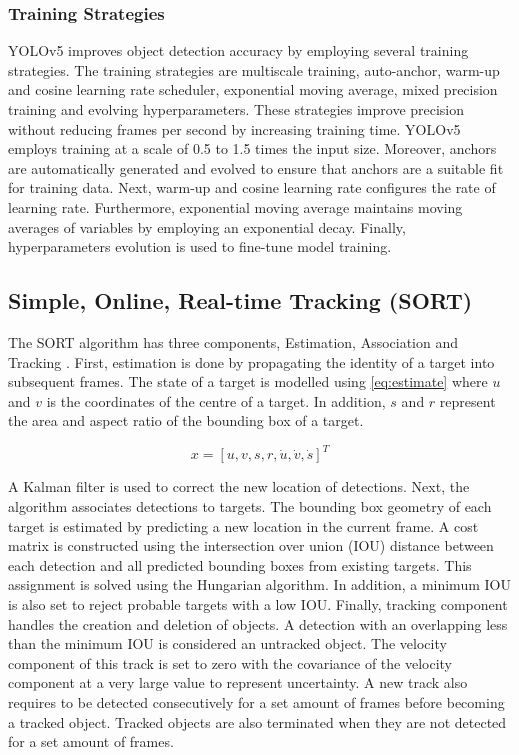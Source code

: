 \documentclass[12pt,a4paper,fleqn]{report}
\begin{document}
\subsubsection{Training Strategies}
YOLOv5 improves object detection accuracy by employing several training strategies.
The training strategies are multiscale training, auto-anchor, warm-up and cosine learning rate
scheduler, exponential moving average, mixed precision training and evolving hyperparameters.
These strategies improve precision without reducing frames per second by increasing training time.
YOLOv5 employs training at a scale of 0.5 to 1.5 times the input size.
Moreover, anchors are automatically generated and evolved to ensure that anchors are a suitable fit for
training data.
Next, warm-up and cosine learning rate configures the rate of learning rate.
Furthermore, exponential moving average maintains moving averages of variables by employing an exponential decay.
Finally, hyperparameters evolution is used to fine-tune model training.


\subsection{Simple, Online, Real-time Tracking (SORT)}
The SORT algorithm has three components, Estimation, Association and Tracking \cite{sort:2016}.
First, estimation is done by propagating the identity of a target into subsequent frames.
The state of a target is modelled using \ref{eq:estimate} where $u$ and $v$ is the coordinates of
the centre of a target.
In addition, $s$ and $r$ represent the area and aspect ratio of the bounding box of a target.

\begin{equation}
    x = [ u, v, s, r, \dot{u}, \dot{v}, \dot{s}] ^ T
    \label{eq:estimate}
\end{equation}

A Kalman filter is used to correct the new location of detections.
Next, the algorithm associates detections to targets.
The bounding box geometry of each target is estimated by predicting a new location in the current
frame.
A cost matrix is constructed using the intersection over union (IOU) distance between each detection
and all predicted bounding boxes from existing targets.
This assignment is solved using the Hungarian algorithm.
In addition, a minimum IOU is also set to reject probable targets with a low IOU.
Finally, tracking component handles the creation and deletion of objects.
A detection with an overlapping less than the minimum IOU is considered an untracked object.
The velocity component of this track is set to zero with the covariance of the velocity component at
a very large value to represent uncertainty.
A new track also requires to be detected consecutively for a set amount of frames before becoming a tracked
object.
Tracked objects are also terminated when they are not detected for a set amount of frames.
\end{document}
